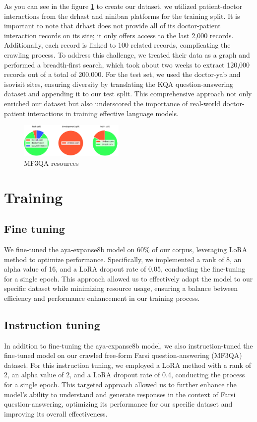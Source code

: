 \documentclass[conference]{IEEEtran}
\begin{document}
As you can see in the figure
\ref{fig2}
to create our dataset, we utilized patient-doctor interactions from the drhast and niniban platforms for the training split. It is important to note that drhast does not provide all of its doctor-patient interaction records on its site; it only offers access to the last 2,000 records. Additionally, each record is linked to 100 related records, complicating the crawling process. To address this challenge, we treated their data as a graph and performed a breadth-first search, which took about two weeks to extract 120,000 records out of a total of 200,000. For the test set, we used the doctor-yab and isovisit sites, ensuring diversity by translating the KQA question-answering dataset
\cite{b10}
and appending it to our test split. This comprehensive approach not only enriched our dataset but also underscored the importance of real-world doctor-patient interactions in training effective language models.

\begin{figure}[htbp]
	\centerline{\includegraphics[width=0.45\textwidth]{fig2.png}}
	\caption{MF3QA resources}
	\label{fig2}
\end{figure}

\section{Training}
\subsection{Fine tuning}
We fine-tuned the aya-expanse8b model on 60\% of our corpus, leveraging LoRA
\cite{b13}
method to optimize performance. Specifically, we implemented a rank of 8, an alpha value of 16, and a LoRA dropout rate of 0.05, conducting the fine-tuning for a single epoch. This approach allowed us to effectively adapt the model to our specific dataset while minimizing resource usage, ensuring a balance between efficiency and performance enhancement in our training process.
\subsection{Instruction tuning}
In addition to fine-tuning the aya-expanse8b model, we also instruction-tuned the fine-tuned model on our crawled free-form Farsi question-answering (MF3QA) dataset. For this instruction tuning, we employed a LoRA method with a rank of 2, an alpha value of 2, and a LoRA dropout rate of 0.4, conducting the process for a single epoch. This targeted approach allowed us to further enhance the model’s ability to understand and generate responses in the context of Farsi question-answering, optimizing its performance for our specific dataset and improving its overall effectiveness.
\end{document}
